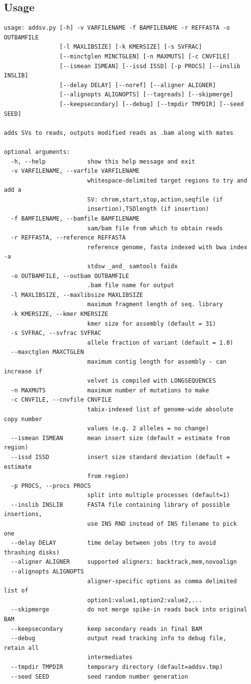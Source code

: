 \documentclass[letterpaper,11pt]{article}
\begin{document}
\subsection{Usage}
\begin{verbatim}
usage: addsv.py [-h] -v VARFILENAME -f BAMFILENAME -r REFFASTA -o OUTBAMFILE
                [-l MAXLIBSIZE] [-k KMERSIZE] [-s SVFRAC]
                [--minctglen MINCTGLEN] [-n MAXMUTS] [-c CNVFILE]
                [--ismean ISMEAN] [--issd ISSD] [-p PROCS] [--inslib INSLIB]
                [--delay DELAY] [--noref] [--aligner ALIGNER]
                [--alignopts ALIGNOPTS] [--tagreads] [--skipmerge]
                [--keepsecondary] [--debug] [--tmpdir TMPDIR] [--seed SEED]

adds SVs to reads, outputs modified reads as .bam along with mates

optional arguments:
  -h, --help            show this help message and exit
  -v VARFILENAME, --varfile VARFILENAME
                        whitespace-delimited target regions to try and add a
                        SV: chrom,start,stop,action,seqfile (if
                        insertion),TSDlength (if insertion)
  -f BAMFILENAME, --bamfile BAMFILENAME
                        sam/bam file from which to obtain reads
  -r REFFASTA, --reference REFFASTA
                        reference genome, fasta indexed with bwa index -a
                        stdsw _and_ samtools faidx
  -o OUTBAMFILE, --outbam OUTBAMFILE
                        .bam file name for output
  -l MAXLIBSIZE, --maxlibsize MAXLIBSIZE
                        maximum fragment length of seq. library
  -k KMERSIZE, --kmer KMERSIZE
                        kmer size for assembly (default = 31)
  -s SVFRAC, --svfrac SVFRAC
                        allele fraction of variant (default = 1.0)
  --maxctglen MAXCTGLEN
                        maximum contig length for assembly - can increase if
                        velvet is compiled with LONGSEQUENCES
  -n MAXMUTS            maximum number of mutations to make
  -c CNVFILE, --cnvfile CNVFILE
                        tabix-indexed list of genome-wide absolute copy number
                        values (e.g. 2 alleles = no change)
  --ismean ISMEAN       mean insert size (default = estimate from region)
  --issd ISSD           insert size standard deviation (default = estimate
                        from region)
  -p PROCS, --procs PROCS
                        split into multiple processes (default=1)
  --inslib INSLIB       FASTA file containing library of possible insertions,
                        use INS RND instead of INS filename to pick one
  --delay DELAY         time delay between jobs (try to avoid thrashing disks)
  --aligner ALIGNER     supported aligners: backtrack,mem,novoalign
  --alignopts ALIGNOPTS
                        aligner-specific options as comma delimited list of
                        option1:value1,option2:value2,...
  --skipmerge           do not merge spike-in reads back into original BAM
  --keepsecondary       keep secondary reads in final BAM
  --debug               output read tracking info to debug file, retain all
                        intermediates
  --tmpdir TMPDIR       temporary directory (default=addsv.tmp)
  --seed SEED           seed random number generation
  

\end{verbatim}
\end{document}
